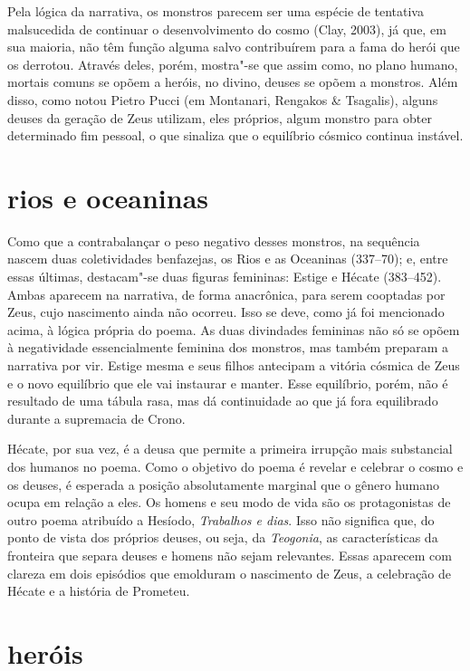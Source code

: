 Pela lógica da narrativa, os monstros parecem ser uma espécie de tentativa
malsucedida de continuar o desenvolvimento do cosmo (Clay, 2003), já que, em sua
maioria, não têm função alguma salvo contribuírem para a fama do herói que os
derrotou. Através deles, porém, mostra"-se que assim como, no plano humano,
mortais comuns se opõem a heróis, no divino, deuses se opõem a monstros. Além
disso, como notou Pietro Pucci (em Montanari, Rengakos \& Tsagalis), alguns
deuses da geração de Zeus utilizam, eles próprios, algum monstro para obter
determinado fim pessoal, o que sinaliza que o equilíbrio cósmico continua
instável.

\section{rios e oceaninas}

Como que a contrabalançar o peso negativo desses monstros, na sequência nascem
duas coletividades benfazejas, os Rios e as Oceaninas (337--70); e, entre essas
últimas, destacam"-se duas figuras femininas: Estige e Hécate (383--452). Ambas
aparecem na narrativa, de forma anacrônica, para serem cooptadas por Zeus, cujo
nascimento ainda não ocorreu. Isso se deve, como já foi mencionado acima, à
lógica própria do poema. As duas divindades femininas não só se opõem à
negatividade essencialmente feminina dos monstros, mas também preparam a
narrativa por vir. Estige mesma e seus filhos antecipam a vitória cósmica
de Zeus e o novo equilíbrio que ele vai instaurar e manter. Esse equilíbrio,
porém, não é resultado de uma tábula rasa, mas dá continuidade ao que já fora
equilibrado durante a supremacia de Crono. 

Hécate, por sua vez, é a deusa que permite a primeira irrupção mais substancial
dos humanos no poema. Como o objetivo do poema é revelar e celebrar o cosmo e os
deuses, é esperada a posição absolutamente marginal que o gênero humano ocupa
em relação a eles. Os homens e seu modo de vida são os protagonistas de outro
poema atribuído a Hesíodo, \textit{Trabalhos e dias}. Isso não significa que,
do ponto de vista dos próprios deuses, ou seja, da \textit{Teogonia}, as
características da fronteira que separa deuses e homens não sejam relevantes.
Essas aparecem com clareza em dois episódios que emolduram o nascimento de
Zeus, a celebração de Hécate e a história de Prometeu.

\section{heróis}

